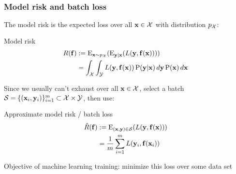 \begin{frame}
    \frametitle{Model risk and batch loss}

    The \alert{model risk} is the expected loss over all $\mathbf{x} \in \mathcal{X}$ with distribution $p_{\mathcal{X}}$:

    \begin{block}{Model risk}
        \vspace{-1em}
        \begin{align*}
            R(\mathbf{f}) &:= \operatorname{\mathrm{E}}_{\mathbf{x} \sim p_{\mathcal{X}}}(\operatorname{\mathrm{E}}_{\mathbf{y} \mid \mathbf{x}}(L(\mathbf{y}, \mathbf{f}(\mathbf{x})))) \\
            &= \int_{\mathcal{X}} \int_{\mathcal{Y}} L(\mathbf{y}, \mathbf{f}(\mathbf{x})) \operatorname{\mathrm{P}}(\mathbf{y} | \mathbf{x}) \, d\mathbf{y} \operatorname{\mathrm{P}}(\mathbf{x}) \, d\mathbf{x}
        \end{align*}
    \end{block}
    \pause

    Since we usually can't exhaust over all $\mathbf{x} \in \mathcal{X}$, select a batch $\mathcal{S} = \{(\mathbf{x}_i, \mathbf{y}_i)\}_{i=1}^m \subset \mathcal{X} \times \mathcal{Y}$, then use:

    \begin{block}{Approximate model risk / batch loss}
        \vspace{-1em}
        \begin{align*}
            \hat{R}(\mathbf{f}) &:= \operatorname{\mathrm{E}}_{(\mathbf{x}, \mathbf{y}) \in \mathcal{S}}(L(\mathbf{y}, \mathbf{f}(\mathbf{x}))) \\
            &= \frac{1}{m} \sum_{i=1}^m L(\mathbf{y}_i, \mathbf{f}(\mathbf{x}_i))
        \end{align*}
    \end{block}
    \pause

    Objective of machine learning training: \alert{minimize this loss over some data set}
\end{frame}

